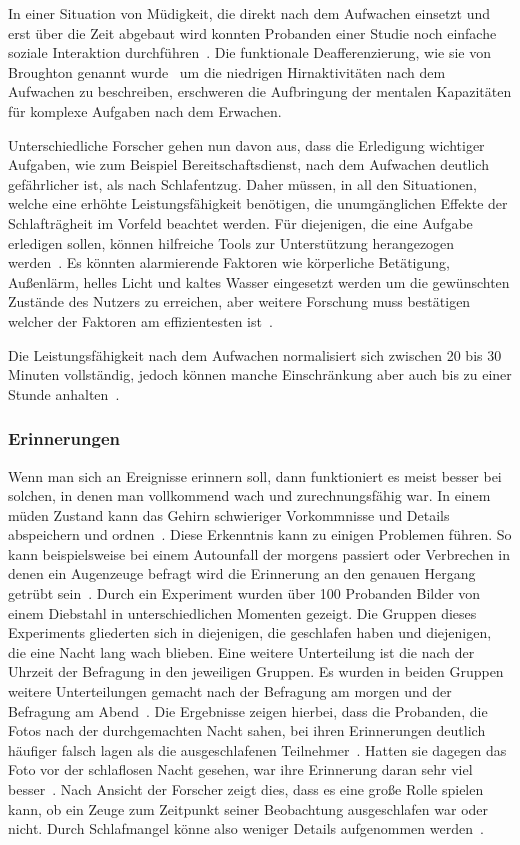 In einer Situation von Müdigkeit, die direkt nach dem Aufwachen einsetzt und erst über die Zeit abgebaut wird konnten Probanden einer Studie noch einfache soziale Interaktion durchführen~\cite{dinges1990you}. 
Die funktionale Deafferenzierung, wie sie von Broughton genannt wurde~\cite{broughton1968sleep} um die niedrigen Hirnaktivitäten nach dem Aufwachen zu beschreiben, erschweren die Aufbringung der mentalen Kapazitäten für komplexe Aufgaben nach dem Erwachen.

Unterschiedliche Forscher gehen nun davon aus, dass die Erledigung wichtiger Aufgaben, wie zum Beispiel Bereitschaftsdienst, nach dem Aufwachen deutlich gefährlicher ist, als nach Schlafentzug.
Daher müssen, in all den Situationen, welche eine erhöhte Leistungsfähigkeit benötigen, die unumgänglichen Effekte der Schlafträgheit im Vorfeld beachtet werden. 
Für diejenigen, die eine Aufgabe erledigen sollen, können hilfreiche Tools zur Unterstützung herangezogen werden~\cite{ferrara2000sleep}. 
Es könnten alarmierende Faktoren wie körperliche Betätigung, Außenlärm, helles Licht und kaltes Wasser eingesetzt werden um die gewünschten Zustände des Nutzers zu erreichen, aber weitere Forschung muss bestätigen welcher der Faktoren am effizientesten ist~\cite{ferrara2000sleep}.

Die Leistungsfähigkeit nach dem Aufwachen normalisiert sich zwischen 20 bis 30 Minuten vollständig, jedoch können manche Einschränkung aber auch bis zu einer Stunde anhalten~\cite{online:muedesGehirn}.

\subsubsection{Erinnerungen}

Wenn man sich an Ereignisse erinnern soll, dann funktioniert es meist besser bei solchen, in denen man vollkommend wach und zurechnungsfähig war. In einem müden Zustand kann das Gehirn schwieriger Vorkommnisse und Details abspeichern und ordnen~\cite{online:streiche}. 
Diese Erkenntnis kann zu einigen Problemen führen. So kann beispielsweise bei einem Autounfall der morgens passiert oder Verbrechen in denen ein Augenzeuge befragt wird die Erinnerung an den genauen Hergang getrübt sein~\cite{online:streiche}. 
Durch ein Experiment wurden über 100 Probanden Bilder von einem Diebstahl in unterschiedlichen Momenten gezeigt. 
Die Gruppen dieses Experiments gliederten sich in diejenigen, die geschlafen haben und diejenigen, die eine Nacht lang wach blieben. Eine weitere Unterteilung ist die nach der Uhrzeit der Befragung in den jeweiligen Gruppen. Es wurden in beiden Gruppen weitere Unterteilungen gemacht nach der Befragung am morgen und der Befragung am Abend~\cite{online:streiche}. 
Die Ergebnisse zeigen hierbei, dass die Probanden, die Fotos nach der durchgemachten Nacht sahen, bei ihren Erinnerungen deutlich häufiger falsch lagen als die ausgeschlafenen Teilnehmer~\cite{online:streiche}.
Hatten sie dagegen das Foto vor der schlaflosen Nacht gesehen, war ihre Erinnerung daran sehr viel besser~\cite{online:streiche}. 
Nach Ansicht der Forscher zeigt dies, dass es eine große Rolle spielen kann, ob ein Zeuge zum Zeitpunkt seiner Beobachtung ausgeschlafen war oder nicht. Durch Schlafmangel könne also weniger Details aufgenommen werden~\cite{online:streiche}.
